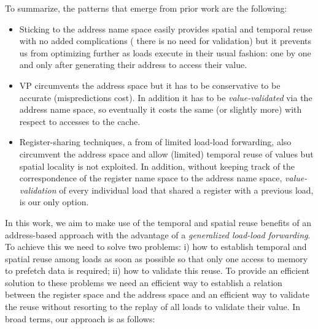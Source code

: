 \documentclass{sig-alternate}
\begin{document}
To summarize, the patterns that emerge from prior work are the following:
\begin{itemize}
\item Sticking to the address name space easily provides spatial and temporal reuse with no added complications ( there is no need for validation) but it prevents us from optimizing further as loads execute in their usual fashion: one by one and only after generating their address to access their value.
\item VP circumvents the address space but it has to be conservative to be accurate (mispredictions cost). In addition it has to be \emph{value-validated} via the address name space, so eventually it costs the same (or slightly more) with respect to accesses to the cache.
\item Register-sharing techniques, a from of limited load-load forwarding, also circumvent the address space and allow (limited) temporal reuse of values but spatial locality is not exploited. In addition, without keeping track of the correspondence of the register name space to the address name space, \emph{value-validation} of every individual load that shared a register with a previous load, is our only option.
\end{itemize}
In this work, we aim to make use of the temporal and spatial reuse benefits of an address-based approach with the advantage of a \emph{generalized load-load forwarding}. To achieve this we need to solve two problems:
i) how to establish temporal and spatial reuse among loads as soon as possible so that only one access to memory to prefetch data is required; ii) how to validate this reuse. To provide an efficient solution to these problems we need an efficient way to establish a relation between the register space and the address space and an efficient way to validate the reuse without resorting to the replay of all loads to validate their value.
In broad terms, our approach is as follows:
\end{document}
